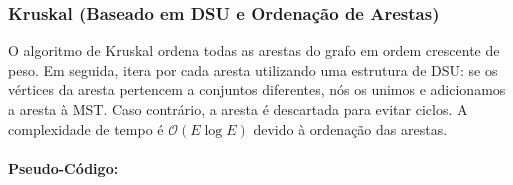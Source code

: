 \subsubsection{Kruskal (Baseado em DSU e Ordenação de Arestas)}
O algoritmo de Kruskal ordena todas as arestas do grafo em ordem crescente de
peso. Em seguida, itera por cada aresta utilizando uma estrutura de DSU: se os
vértices da aresta pertencem a conjuntos diferentes, nós os unimos e
adicionamos a aresta à MST. Caso contrário, a aresta é descartada para evitar
ciclos. A complexidade de tempo é $\mathcal{O}(E \log E)$ devido à ordenação
das arestas.

\paragraph{Pseudo-Código: }\mbox{}\\
\begin{algorithm}[H]
    \SetAlgoLined

    \caption{Algoritmo de Kruskal}
\end{algorithm}

